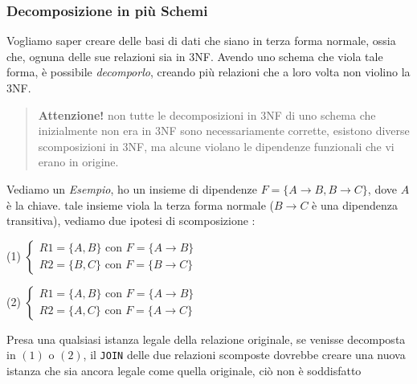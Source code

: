 \documentclass[12pt, letterpaper]{article}
\newcommand{\code}[1]{\colorbox{light-gray}{\texttt{#1}}}
\begin{document}
\subsubsection{Decomposizione in più Schemi}
Vogliamo saper creare delle basi di dati che siano in terza forma normale, ossia che, ognuna delle sue relazioni sia 
in 3NF. Avendo uno schema che viola tale forma, è possibile \textit{decomporlo}, creando più relazioni che a loro 
volta non violino la 3NF.\begin{quote}
    \textbf{Attenzione!} non tutte le decomposizioni in 3NF di uno schema che inizialmente non era in 3NF sono necessariamente
    corrette, esistono diverse scomposizioni in 3NF, ma alcune violano le dipendenze funzionali che vi erano in origine.
\end{quote}
Vediamo un \textit{Esempio}, ho un insieme di dipendenze \(F=\{A\rightarrow B,B\rightarrow C\}\), dove \(A\) è la chiave. 
tale insieme viola la terza forma normale (\(B\rightarrow C\) è una dipendenza transitiva), vediamo due ipotesi di scomposizione :
\begin{center}
    (1) \(
        \begin{cases}
            R1 = \{A,B\} \text{ con } F=\{A\rightarrow B\}\\
            R2 = \{B,C\} \text{ con } F=\{B\rightarrow C\}
        \end{cases}
    \)
\end{center}
\begin{center}
    (2) \(
        \begin{cases}
            R1 = \{A,B\} \text{ con } F=\{A\rightarrow B\}\\
            R2 = \{A,C\} \text{ con } F=\{A\rightarrow C\}
        \end{cases}
    \)
\end{center}
Presa una qualsiasi istanza legale della relazione originale, se venisse decomposta in \((1)\) o \((2)\), il \code{JOIN} delle 
due relazioni scomposte dovrebbe creare una nuova istanza che sia ancora legale come quella originale, ciò non è soddisfatto 
\end{document}
